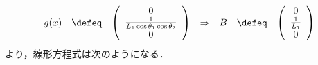 \begin{frame}[t]
\begin{equation*}
\begin{array}{lclclcl}
  g(x) &\defeq&
  \left(
   \begin{array}{c}
    0 \\
    \frac{1}{L_1 \cos \theta_1 \cos \theta_2} \\
    0
   \end{array}
  \right) &\Rightarrow&
  B &\defeq&
  \left(
   \begin{array}{c}
    0 \\
    \frac{1}{L_1} \\
    0
   \end{array}
 \right)
 \end{array}
\end{equation*}
      より，線形方程式は次のようになる．
\end{frame}

